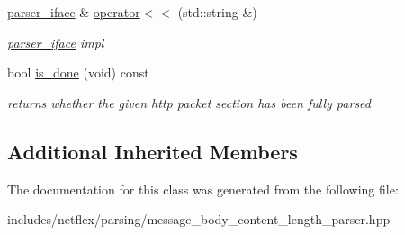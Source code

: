 \begin{DoxyCompactItemize}
\hyperlink{classnetflex_1_1parsing_1_1parser__iface}{parser\+\_\+iface} \& \hyperlink{classnetflex_1_1parsing_1_1message__body__content__length__parser_a57265653361c2c29919799e2a7346a48}{operator$<$$<$} (std\+::string \&)
\begin{DoxyCompactList}\small\item\em \hyperlink{classnetflex_1_1parsing_1_1parser__iface}{parser\+\_\+iface} impl \end{DoxyCompactList}\item 
\mbox{\label{classnetflex_1_1parsing_1_1message__body__content__length__parser_abe03e2f2d6f61076cf147a4bcd7f80c5}} 
bool \hyperlink{classnetflex_1_1parsing_1_1message__body__content__length__parser_abe03e2f2d6f61076cf147a4bcd7f80c5}{is\+\_\+done} (void) const
\begin{DoxyCompactList}\small\item\em returns whether the given http packet section has been fully parsed \end{DoxyCompactList}\end{DoxyCompactItemize}
\subsection*{Additional Inherited Members}


The documentation for this class was generated from the following file\+:\begin{DoxyCompactItemize}
\item 
includes/netflex/parsing/message\+\_\+body\+\_\+content\+\_\+length\+\_\+parser.\+hpp\end{DoxyCompactItemize}
